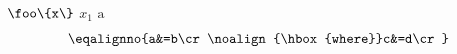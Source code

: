 \documentclass{article}
\begin{document}
$\vbox{\ttfamily\hbox{\string\foo\string\{x\string\}}}$ $x_1$ \textbf{$\mbox{a}$}
{\bfseries $$\eqalignno{a&=b\cr\noalign{\hbox{where}}c&=d\cr}$$}
\end{document}
